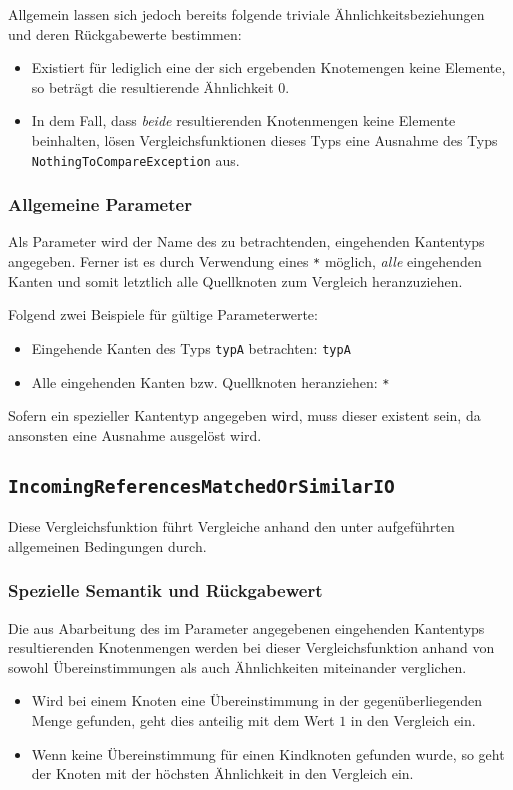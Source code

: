 Allgemein lassen sich jedoch bereits folgende triviale Ähnlichkeitsbeziehungen und deren Rückgabewerte bestimmen:
\begin{itemize}
	\item Existiert für lediglich eine der sich ergebenden Knotemengen keine Elemente, so beträgt die resultierende Ähnlichkeit $0$.
	\item In dem Fall, dass \emph{beide} resultierenden Knotenmengen keine Elemente beinhalten, lösen Vergleichsfunktionen dieses Typs eine Ausnahme des Typs \texttt{NothingToCompareException} aus.
\end{itemize}

\subsubsection*{Allgemeine Parameter}
Als Parameter wird der Name des zu betrachtenden, eingehenden Kantentyps angegeben. Ferner ist es durch Verwendung eines \texttt{*} möglich, \emph{alle} eingehenden Kanten und somit letztlich alle Quellknoten zum Vergleich heranzuziehen.

Folgend zwei Beispiele für gültige Parameterwerte:
\begin{itemize}
	\item Eingehende Kanten des Typs \texttt{typA} betrachten:  \texttt{typA}
	\item Alle eingehenden Kanten bzw. Quellknoten heranziehen:  \texttt{*}
\end{itemize}

 Sofern ein spezieller Kantentyp angegeben wird, muss dieser existent sein, da ansonsten eine Ausnahme ausgelöst wird.

\newpage
%
%
\subsection{\texttt{IncomingReferencesMatchedOrSimilarIO}}
Diese Vergleichsfunktion führt Vergleiche anhand den unter\mylinebreak{} aufgeführten allgemeinen Bedingungen durch.

\subsubsection*{Spezielle Semantik und Rückgabewert}
Die aus Abarbeitung des im Parameter angegebenen eingehenden Kantentyps resultierenden Knotenmengen werden bei dieser Vergleichsfunktion anhand von sowohl Übereinstimmungen als auch Ähnlichkeiten miteinander verglichen.
\begin{itemize}
	\item Wird bei einem Knoten eine Übereinstimmung in der gegenüberliegenden Menge gefunden, geht dies anteilig mit dem Wert $1$ in den Vergleich ein.
	\item Wenn keine Übereinstimmung für einen Kindknoten gefunden wurde, so geht der Knoten mit der höchsten Ähnlichkeit in den Vergleich ein.
\end{itemize}

